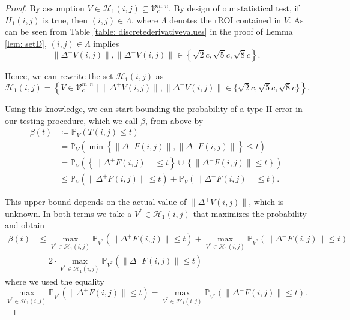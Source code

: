 \documentclass[a4paper,12pt]{article}
\newcommand{\norm}[1]{\lVert#1\rVert}
\theoremstyle{plain}
\theoremstyle{definition}
\begin{document}
\begin{proof}
	By assumption $V \in \mathcal{H}_1(i, j) \subseteq \mathcal{V}_c^{m, n}$. By design of our statistical test, if $H_1(i, j)$ is true, then $(i, j) \in \varLambda$, where $\varLambda$ denotes the rROI contained in $V$. As can be seen from Table \ref{table: discretederivativevalues} in the proof of Lemma \ref{lem: setD}, $(i, j) \in \varLambda$ implies
	\begin{equation*}
		\norm{\Delta^+ V(i, j)}, \norm{\Delta^- V(i, j)} \in \left\{ \sqrt{2} c, \sqrt{5} c, \sqrt{8} c \right\}.
	\end{equation*}
	
	Hence, we can rewrite the set $\mathcal{H}_1(i, j)$ as
	\begin{equation*}
		\mathcal{H}_1(i, j) = \left\{ V \in \mathcal{V}_c^{m, n} \mid \norm{\Delta^+ V(i, j)}, \norm{\Delta^- V(i, j)} \in \{ \sqrt{2} c, \sqrt{5} c, \sqrt{8} c \} \right\}.
	\end{equation*}
	
	Using this knowledge, we can start bounding the probability of a type II error in our testing procedure, which we call $\beta$, from above by
	\begin{align*}
		\beta(t) &\coloneqq \mathbb{P}_V\left( T(i, j) \leq t \right) \\
		&= \mathbb{P}_V\left( \min \left\{ \norm{\Delta^+ F(i, j)}, \norm{\Delta^- F(i, j)} \right\} \leq t \right) \\
		&= \mathbb{P}_V\left( \left\{ \norm{\Delta^+ F(i, j)} \leq t \right\} \cup \left\{ \norm{\Delta^- F(i, j)} \leq t \right\} \right) \\
		&\leq \mathbb{P}_V\left( \norm{\Delta^+ F(i, j)} \leq t \right) + \mathbb{P}_V\left( \norm{\Delta^- F(i, j)} \leq t \right).
	\end{align*}
	
	This upper bound depends on the actual value of $\norm{\Delta^+ V(i, j)}$, which is unknown. In both terms we take a $V^* \in \mathcal{H}_1(i, j)$ that maximizes the probability and obtain
	\begin{align*}
		\beta(t) &\leq \max_{V^* \in \mathcal{H}_1(i, j)} \mathbb{P}_{V^*}\left( \norm{\Delta^+ F(i, j)} \leq t \right) + \max_{V^* \in \mathcal{H}_1(i, j)} \mathbb{P}_{V^*}\left( \norm{\Delta^- F(i, j)} \leq t \right) \\
		&= 2 \cdot \max_{V^* \in \mathcal{H}_1(i, j)} \mathbb{P}_{V^*}\left( \norm{\Delta^+ F(i, j)} \leq t \right)
	\end{align*}
	where we used the equality
	\begin{equation*}
		\max_{V^* \in \mathcal{H}_1(i, j)} \mathbb{P}_{V^*}\left( \norm{\Delta^+ F(i, j)} \leq t \right) = \max_{V^* \in \mathcal{H}_1(i, j)} \mathbb{P}_{V^*}\left( \norm{\Delta^- F(i, j)} \leq t \right).
	\end{equation*}
	

\end{proof}
\end{document}
